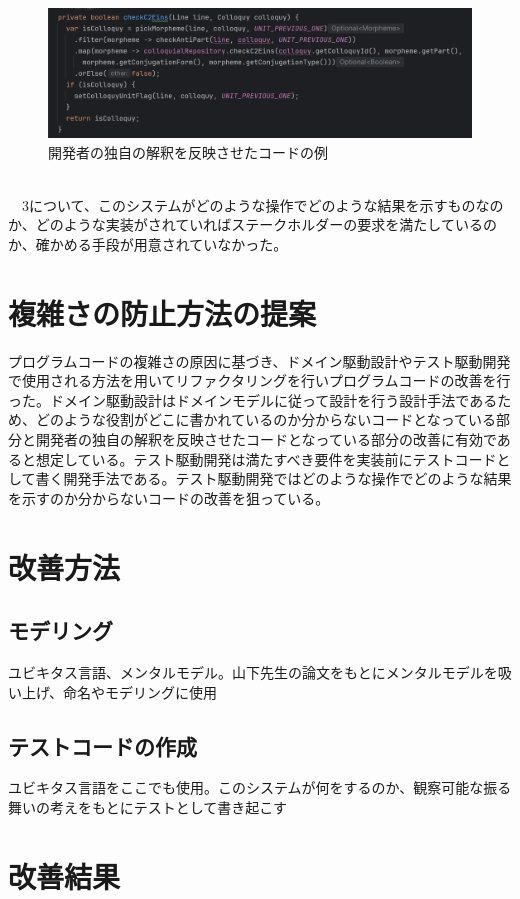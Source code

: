 \documentclass[11pt, a4paper]{jreport}
\begin{document}
\begin{figure}
\centering
\includegraphics[width=1\linewidth]{image/geini2.png}
\caption{開発者の独自の解釈を反映させたコードの例}
\label{fig:enter-label}
\end{figure}
\\　3について、このシステムがどのような操作でどのような結果を示すものなのか、どのような実装がされていればステークホルダーの要求を満たしているのか、確かめる手段が用意されていなかった。
\section{複雑さの防止方法の提案}
プログラムコードの複雑さの原因に基づき、ドメイン駆動設計やテスト駆動開発で使用される方法を用いてリファクタリングを行いプログラムコードの改善を行った。ドメイン駆動設計はドメインモデルに従って設計を行う設計手法であるため、どのような役割がどこに書かれているのか分からないコードとなっている部分と開発者の独自の解釈を反映させたコードとなっている部分の改善に有効であると想定している。テスト駆動開発は満たすべき要件を実装前にテストコードとして書く開発手法である。テスト駆動開発ではどのような操作でどのような結果を示すのか分からないコードの改善を狙っている。
\section{改善方法}
\subsection{モデリング}
ユビキタス言語、メンタルモデル。山下先生の論文をもとにメンタルモデルを吸い上げ、命名やモデリングに使用
\subsection{テストコードの作成}
ユビキタス言語をここでも使用。このシステムが何をするのか、観察可能な振る舞いの考えをもとにテストとして書き起こす
\section{改善結果}
\end{document}
